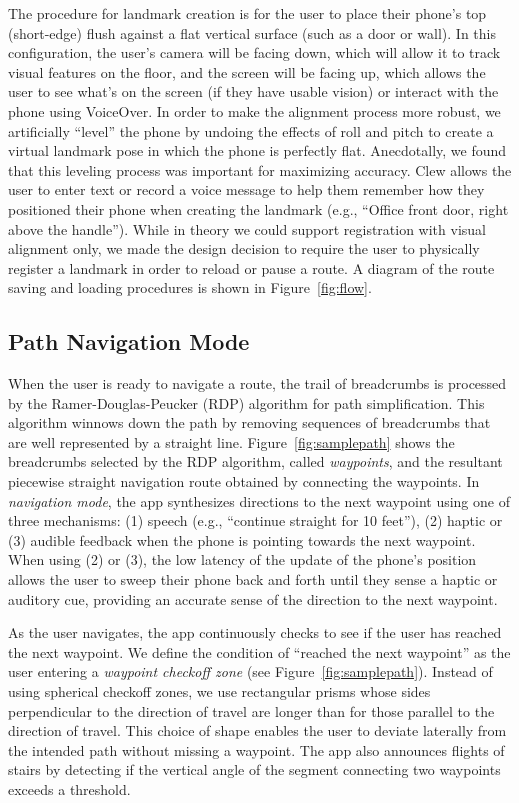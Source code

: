 \documentclass[chi_draft]{sigchi}
\begin{document}
The procedure for landmark creation is for the user to place their phone's top (short-edge) flush against a flat vertical surface (such as a door or wall).  In this configuration, the user's camera will be facing down, which will allow it to track visual features on the floor, and the screen will be facing up, which allows the user to see what's on the screen (if they have usable vision) or interact with the phone using VoiceOver.  In order to make the alignment process more robust, we artificially ``level'' the phone by undoing the effects of roll and pitch to create a virtual landmark pose in which the phone is perfectly flat.  Anecdotally, we found that this leveling process was important for maximizing accuracy.  Clew allows the user to enter text or record a voice message to help them remember how they positioned their phone when creating the landmark (e.g., ``Office front door, right above the handle'').  While in theory we could support registration with visual alignment only, we made the design decision to require the user to physically register a landmark in order to reload or pause a route.  A diagram of the route saving and loading procedures is shown in Figure~\ref{fig:flow}.

\subsection{Path Navigation Mode}\label{sec:pathnavigationmode}

When the user is ready to navigate a route, the trail of breadcrumbs is processed by the Ramer-Douglas-Peucker (RDP) algorithm \cite{douglas1973algorithms} for path simplification.  This algorithm winnows down the path by removing sequences of breadcrumbs that are well represented by a straight line.  Figure~\ref{fig:samplepath} shows the breadcrumbs selected by the RDP algorithm, called \emph{waypoints}, and the resultant piecewise straight navigation route obtained by connecting the waypoints.  In \emph{navigation mode}, the app synthesizes directions to the next waypoint using one of three mechanisms: (1) speech (e.g., ``continue straight for 10 feet''), (2) haptic or (3) audible feedback when the phone is pointing towards the next waypoint.  When using (2) or (3), the low latency of the update of the phone's position allows the user to sweep their phone back and forth until they sense a haptic or auditory cue, providing an accurate sense of the direction to the next waypoint.

As the user navigates, the app continuously checks to see if the user has reached the next waypoint.  We define the condition of ``reached the next waypoint'' as the user entering a \emph{waypoint checkoff zone} (see Figure~\ref{fig:samplepath}).  Instead of using spherical checkoff zones, we use rectangular prisms whose sides perpendicular to the direction of travel are longer than for those parallel to the direction of travel.  This choice of shape enables the user to deviate laterally from the intended path without missing a waypoint.  The app also announces flights of stairs by detecting if the vertical angle of the segment connecting two waypoints exceeds a threshold.
\end{document}
